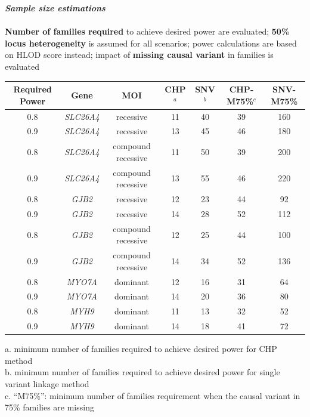 \documentclass[ansiepaper, portrait, fontscale=0.35]{baposter} %
\newcommand{\hf}[1]{{\color{BaylorBurgundy}\textbf{#1}}}
\begin{document}
\begin{poster}
{\begin{center}
\begin{tabular}{cc}
  \end{tabular}
\end{center}
\textbf{\textit{Sample size estimations}}\\\\\hf{Number of families required} to achieve desired power are evaluated; \hf{50\% locus heterogeneity} is assumed for all scenarios; power calculations are based on HLOD score instead; impact of \hf{missing causal variant} in families is evaluated
\begin{center}
{\small \begin{longtable}{ccccccc}
\hline
\textbf{Required Power}&\textbf{Gene}&\textbf{MOI}&\textbf{CHP}$^a$&\textbf{SNV}$^b$&\textbf{CHP-M75}\%$^c$&\textbf{SNV-M75}\%\\
\hline
0.8&\textsl{SLC26A4}&recessive&11&40&39&160\\
0.9&\textsl{SLC26A4}&recessive&13&45&46&180\\
0.8&\textsl{SLC26A4}&compound recessive&11&50&39&200\\
0.9&\textsl{SLC26A4}&compound recessive&13&55&46&220\\
0.8&\textsl{GJB2}&recessive&12&23&44&92\\
0.9&\textsl{GJB2}&recessive&14&28&52&112\\
0.8&\textsl{GJB2}&compound recessive&12&25&44&100\\
0.9&\textsl{GJB2}&compound recessive&14&34&52&136\\
0.8&\textsl{MYO7A}&dominant&12&16&31&64\\
0.9&\textsl{MYO7A}&dominant&14&20&36&80\\
0.8&\textsl{MYH9}&dominant&11&13&32&52\\
0.9&\textsl{MYH9}&dominant&14&18&41&72\\
\hline
\end{longtable}}
\vspace{-0.5em}
{\small a. minimum number of families required to achieve desired power for CHP method}\\
{\small b. minimum number of families required to achieve desired power for single variant linkage method}\\
{\small c. ``M75\%'': minimum number of families requirement when the causal variant in 75\% families are missing}
\end{center}
}
\end{poster}
\end{document}
